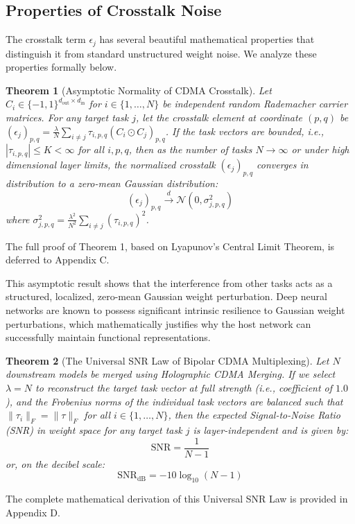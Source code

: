 \documentclass{article}
\newtheorem{theorem}{Theorem}
\begin{document}
\subsection{Properties of Crosstalk Noise}
The crosstalk term $\epsilon_j$ has several beautiful mathematical properties that distinguish it from standard unstructured weight noise. We analyze these properties formally below.

\begin{theorem}[Asymptotic Normality of CDMA Crosstalk]
Let $C_i \in \{-1, 1\}^{d_{\text{out}} \times d_{\text{in}}}$ for $i \in \{1, \ldots, N\}$ be independent random Rademacher carrier matrices. For any target task $j$, let the crosstalk element at coordinate $(p, q)$ be $(\epsilon_j)_{p, q} = \frac{\lambda}{N} \sum_{i \neq j} \tau_{i, p, q} (C_i \odot C_j)_{p, q}$. 
If the task vectors are bounded, i.e., $|\tau_{i, p, q}| \le K < \infty$ for all $i, p, q$, then as the number of tasks $N \to \infty$ or under high dimensional layer limits, the normalized crosstalk $(\epsilon_j)_{p, q}$ converges in distribution to a zero-mean Gaussian distribution:
\begin{equation}
    (\epsilon_j)_{p, q} \xrightarrow{d} \mathcal{N}\left(0, \sigma^2_{j, p, q}\right)
\end{equation}
where $\sigma^2_{j, p, q} = \frac{\lambda^2}{N^2} \sum_{i \neq j} (\tau_{i, p, q})^2$.
\end{theorem}
The full proof of Theorem 1, based on Lyapunov's Central Limit Theorem, is deferred to Appendix C.

This asymptotic result shows that the interference from other tasks acts as a structured, localized, zero-mean Gaussian weight perturbation. Deep neural networks are known to possess significant intrinsic resilience to Gaussian weight perturbations, which mathematically justifies why the host network can successfully maintain functional representations.

\begin{theorem}[The Universal SNR Law of Bipolar CDMA Multiplexing]
Let $N$ downstream models be merged using Holographic CDMA Merging. If we select $\lambda = N$ to reconstruct the target task vector at full strength (i.e., coefficient of $1.0$), and the Frobenius norms of the individual task vectors are balanced such that $\|\tau_i\|_F = \|\tau\|_F$ for all $i \in \{1, \dots, N\}$, then the expected Signal-to-Noise Ratio (SNR) in weight space for any target task $j$ is layer-independent and is given by:
\begin{equation}
    \text{SNR} = \frac{1}{N - 1}
\end{equation}
or, on the decibel scale:
\begin{equation}
    \text{SNR}_{\text{dB}} = -10 \log_{10}(N - 1)
\end{equation}
\end{theorem}
The complete mathematical derivation of this Universal SNR Law is provided in Appendix D.
\end{document}
